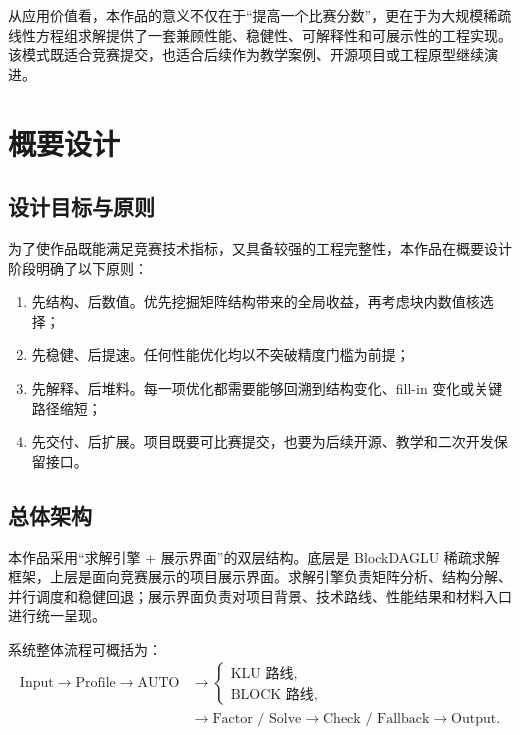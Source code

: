 \documentclass[12pt,a4paper,fontset=none]{ctexart}
\begin{document}
从应用价值看，本作品的意义不仅在于“提高一个比赛分数”，更在于为大规模稀疏线性方程组求解提供了一套兼顾性能、稳健性、可解释性和可展示性的工程实现。该模式既适合竞赛提交，也适合后续作为教学案例、开源项目或工程原型继续演进。

\section{概要设计}

\subsection{设计目标与原则}

为了使作品既能满足竞赛技术指标，又具备较强的工程完整性，本作品在概要设计阶段明确了以下原则：
\begin{enumerate}
  \item 先结构、后数值。优先挖掘矩阵结构带来的全局收益，再考虑块内数值核选择；
  \item 先稳健、后提速。任何性能优化均以不突破精度门槛为前提；
  \item 先解释、后堆料。每一项优化都需要能够回溯到结构变化、fill-in 变化或关键路径缩短；
  \item 先交付、后扩展。项目既要可比赛提交，也要为后续开源、教学和二次开发保留接口。
\end{enumerate}

\subsection{总体架构}

本作品采用“求解引擎 + 展示界面”的双层结构。底层是 BlockDAGLU 稀疏求解框架，上层是面向竞赛展示的项目展示界面。求解引擎负责矩阵分析、结构分解、并行调度和稳健回退；展示界面负责对项目背景、技术路线、性能结果和材料入口进行统一呈现。

系统整体流程可概括为：
\begin{equation}
\begin{aligned}
\text{Input}\rightarrow \text{Profile}\rightarrow \text{AUTO}
&\rightarrow
\begin{cases}
\text{KLU 路线},\\
\text{BLOCK 路线},
\end{cases}\\
&\rightarrow \text{Factor / Solve}\rightarrow \text{Check / Fallback}\rightarrow \text{Output}.
\end{aligned}
\end{equation}
\end{document}
